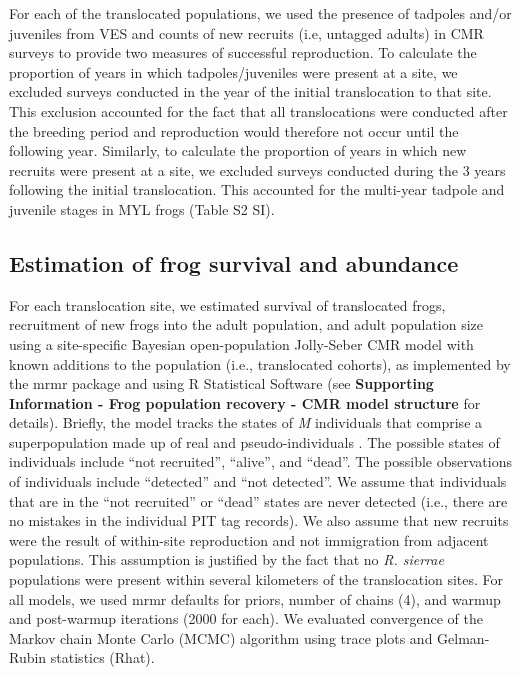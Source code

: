\documentclass[9pt,twocolumn,twoside,lineno]{pnas-new}
\begin{document}
{For each of the translocated populations, we used the presence of
tadpoles and/or juveniles from VES and counts of new recruits (i.e,
untagged adults) in CMR surveys to provide two measures of successful
reproduction. To calculate the proportion of years in which
tadpoles/juveniles were present at a site, we excluded surveys conducted
in the year of the initial translocation to that site. This exclusion
accounted for the fact that all translocations were conducted after the
breeding period and reproduction would therefore not occur until the
following year. Similarly, to calculate the proportion of years in which
new recruits were present at a site, we excluded surveys conducted
during the 3 years following the initial translocation. This accounted
for the multi-year tadpole and juvenile stages in MYL frogs
(Table S2 SI).

\hypertarget{estimation-of-frog-survival-and-abundance}{%
\subsection*{Estimation of frog survival and
abundance}\label{estimation-of-frog-survival-and-abundance}}

For each translocation site, we estimated survival of translocated
frogs, recruitment of new frogs into the adult population, and adult
population size using a site-specific Bayesian open-population
Jolly-Seber CMR model with known additions to the population (i.e.,
translocated cohorts), as implemented by the mrmr package
\citep{joseph2019} and using R Statistical Software
\citep[v4.4.4,][]{rsoftware2022} (see \textbf{Supporting Information -
Frog population recovery - CMR model structure} for details). Briefly,
the model tracks the states of \emph{M} individuals that comprise a
superpopulation made up of real and pseudo-individuals \citep[see][ for
details]{joseph2018}. The possible states of individuals include ``not
recruited'', ``alive'', and ``dead''. The possible observations of
individuals include ``detected'' and ``not detected''. We assume that
individuals that are in the ``not recruited'' or ``dead'' states are
never detected (i.e., there are no mistakes in the individual PIT tag
records). We also assume that new recruits were the result of
within-site reproduction and not immigration from adjacent populations.
This assumption is justified by the fact that no \emph{R. sierrae}
populations were present within several kilometers of the translocation
sites. For all models, we used mrmr defaults for priors, number of
chains (4), and warmup and post-warmup iterations (2000 for each). We
evaluated convergence of the Markov chain Monte Carlo (MCMC) algorithm
using trace plots and Gelman-Rubin statistics (Rhat).

}
\end{document}
